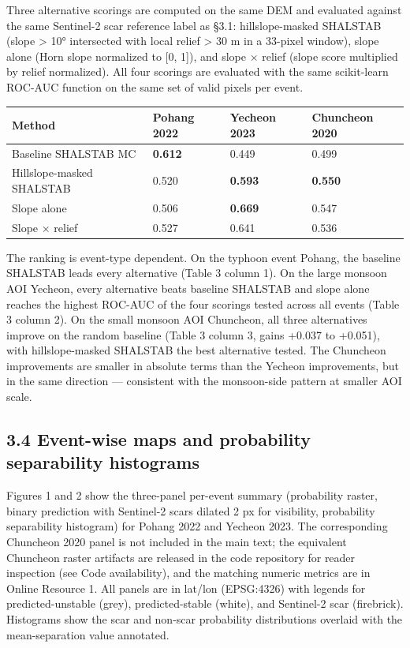 \documentclass[11pt,a4paper]{article}
\newcounter{none}
\begin{document}
Three alternative scorings are computed on the same DEM and evaluated against the same Sentinel-2 scar reference label as §3.1: hillslope-masked SHALSTAB (slope \textgreater{} 10° intersected with local relief \textgreater{} 30 m in a 33-pixel window), slope alone (Horn slope normalized to {[}0, 1{]}), and slope × relief (slope score multiplied by relief normalized). All four scorings are evaluated with the same scikit-learn ROC-AUC function on the same set of valid pixels per event.

{\def\LTcaptype{none} %
\begin{longtable}[]{@{}llll@{}}
\toprule\noalign{}
Method & Pohang 2022 & Yecheon 2023 & Chuncheon 2020 \\
\midrule\noalign{}
\endhead
\bottomrule\noalign{}
\endlastfoot
Baseline SHALSTAB MC & \textbf{0.612} & 0.449 & 0.499 \\
Hillslope-masked SHALSTAB & 0.520 & \textbf{0.593} & \textbf{0.550} \\
Slope alone & 0.506 & \textbf{0.669} & 0.547 \\
Slope × relief & 0.527 & 0.641 & 0.536 \\
\end{longtable}
}

The ranking is event-type dependent. On the typhoon event Pohang, the baseline SHALSTAB leads every alternative (Table 3 column 1). On the large monsoon AOI Yecheon, every alternative beats baseline SHALSTAB and slope alone reaches the highest ROC-AUC of the four scorings tested across all events (Table 3 column 2). On the small monsoon AOI Chuncheon, all three alternatives improve on the random baseline (Table 3 column 3, gains +0.037 to +0.051), with hillslope-masked SHALSTAB the best alternative tested. The Chuncheon improvements are smaller in absolute terms than the Yecheon improvements, but in the same direction --- consistent with the monsoon-side pattern at smaller AOI scale.

\subsection{3.4 Event-wise maps and probability separability histograms}\label{event-wise-maps-and-probability-separability-histograms}

Figures 1 and 2 show the three-panel per-event summary (probability raster, binary prediction with Sentinel-2 scars dilated 2 px for visibility, probability separability histogram) for Pohang 2022 and Yecheon 2023. The corresponding Chuncheon 2020 panel is not included in the main text; the equivalent Chuncheon raster artifacts are released in the code repository for reader inspection (see Code availability), and the matching numeric metrics are in Online Resource 1. All panels are in lat/lon (EPSG:4326) with legends for predicted-unstable (grey), predicted-stable (white), and Sentinel-2 scar (firebrick). Histograms show the scar and non-scar probability distributions overlaid with the mean-separation value annotated.
\end{document}
